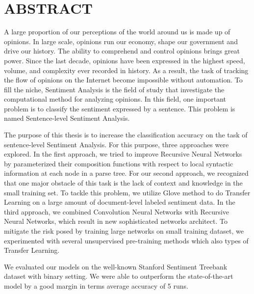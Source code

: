 \chapter*{ABSTRACT}
\label{tomtat}

A large proportion of our perceptions of the world around us is made up of opinions.
In large scale, opinions run our economy, shape our government and drive our history. 
The ability to comprehend and control opinions brings great power.
Since the last decade, opinions have been expressed in the highest speed, volume, and complexity ever recorded in history.
As a result, the task of tracking the flow of opinions on the Internet become impossible without automation.  
To fill the niche, Sentiment Analysis is the field of study that investigate the computational method for analyzing opinions.
In this field, one important problem is to classify the sentiment expressed by a sentence.
This problem is named Sentence-level Sentiment Analysis.

The purpose of this thesis is to increase the classification accuracy on the task of sentence-level Sentiment Analysis.
For this purpose, three approaches were explored.
In the first approach, we tried to improve Recursive Neural Networks by parameterized their composition functions with respect to local syntactic information at each node in a parse tree.
For our second approach, we recognized that one major obstacle of this task is the lack of context and knowledge in the small training set.
To tackle this problem, we utilize Glove method to do Transfer Learning on a large amount of document-level labeled sentiment data.
In the third approach, we combined Convolution Neural Networks with Recursive Neural Networks, which result in new sophisticated networks architect. 
To mitigate the risk posed by training large networks on small training dataset, we experimented with several unsupervised pre-training methods which also types of Transfer Learning.

We evaluated our models on the well-known Stanford Sentiment Treebank dataset with binary setting. 
We were able to outperform the state-of-the-art model by a good margin in terms average accuracy of 5 runs.